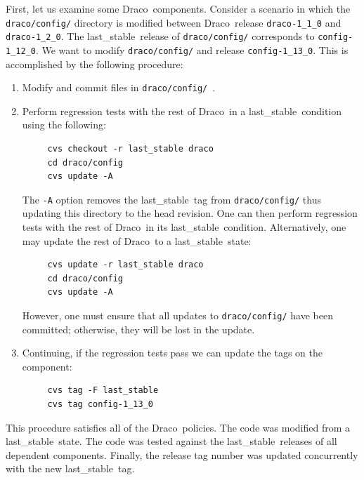 \documentclass[11pt]{nmemo}
\newcommand{\draco}{{\normalfont\normalsize\sffamily Draco}}
\newcommand{\stable}{{\normalfont\normalsize\ttfamily last\_stable}}
\begin{document}
First, let us examine some \draco\ components.  Consider a scenario in
which the \texttt{draco/config/} directory is modified between \draco\ 
release \texttt{draco-1\_1\_0} and \texttt{draco-1\_2\_0}.  The
\stable\ release of \texttt{draco/config/} corresponds to
\texttt{config-1\_12\_0}.  We want to modify \texttt{draco/config/}
and release \texttt{config-1\_13\_0}.  This is accomplished by the
following procedure:
\begin{enumerate}
\item Modify and commit files in \texttt{draco/config/}\ .
\item Perform regression tests with the rest of \draco\ in a \stable\ 
  condition using the following:
\begin{verbatim}
     cvs checkout -r last_stable draco
     cd draco/config
     cvs update -A
\end{verbatim}
  The \texttt{-A} option removes the \stable\ tag from
  \texttt{draco/config/} thus updating this directory to the head
  revision.  One can then perform regression tests with the rest of
  \draco\ in its \stable\ condition.  Alternatively, one may update
  the rest of \draco\ to a \stable\ state:
\begin{verbatim}
     cvs update -r last_stable draco
     cd draco/config
     cvs update -A
\end{verbatim}
  However, one must ensure that all updates to \texttt{draco/config/}
  have been committed; otherwise, they will be lost in the update.
\item Continuing, if the regression tests pass we can update the tags
  on the component:
\begin{verbatim}
     cvs tag -F last_stable
     cvs tag config-1_13_0
\end{verbatim}
\end{enumerate}
This procedure satisfies all of the \draco\ policies.  The code was
modified from a \stable\ state.  The code was tested against the
\stable\ releases of all dependent components.  Finally, the release
tag number was updated concurrently with the new \stable\ tag.
\end{document}

